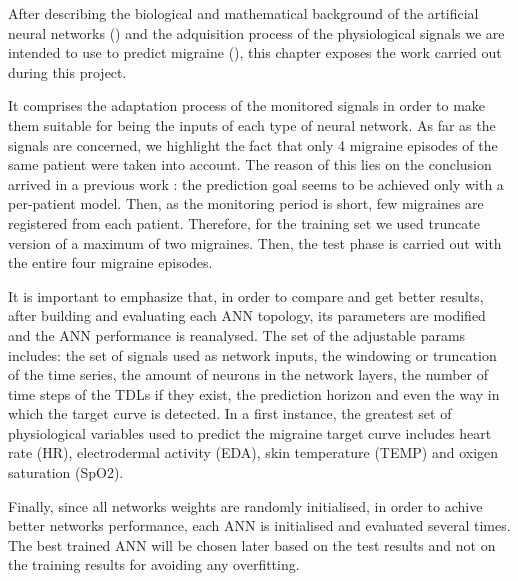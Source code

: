 \label{chapter:application}

After describing the biological and mathematical background of the
artificial neural networks () and the adquisition process
of the physiological signals we are intended to use to predict
migraine (), this chapter exposes the work carried out
during this project.


It comprises the adaptation process of the monitored signals in order
to make them suitable for being the inputs of each type of neural
network.  As far as the signals are concerned, we highlight the fact
that only 4 migraine episodes of the same patient were taken into
account.  The reason of this lies on the conclusion arrived in a
previous work \cite{Irene:PFC:2014}: the prediction goal seems to be
achieved only with a per-patient model.  Then, as the monitoring period
is short, few migraines are registered from each patient.  Therefore,
for the training set we used truncate version of a maximum of two
migraines. Then, the test phase is carried out with the entire four
migraine episodes.


It is important to emphasize that, in order to compare and get better
results, after building and evaluating each ANN topology, its
parameters are modified and the ANN performance is reanalysed.  The
set of the adjustable params includes: the set of signals used as
network inputs, the windowing or truncation of the time series, the
amount of neurons in the network layers, the number of time steps of
the TDLs if they exist, the prediction horizon and even the way in
which the target curve is detected.  In a first instance, the greatest
set of physiological variables used to predict the migraine target
curve includes heart rate (HR), electrodermal activity (EDA), skin
temperature (TEMP) and oxigen saturation (SpO2).

Finally, since all networks weights are randomly initialised, in order
to achive better networks performance, each ANN is initialised and
evaluated several times. The best trained ANN will be chosen later
based on the test results and not on the training results for avoiding
any overfitting.
